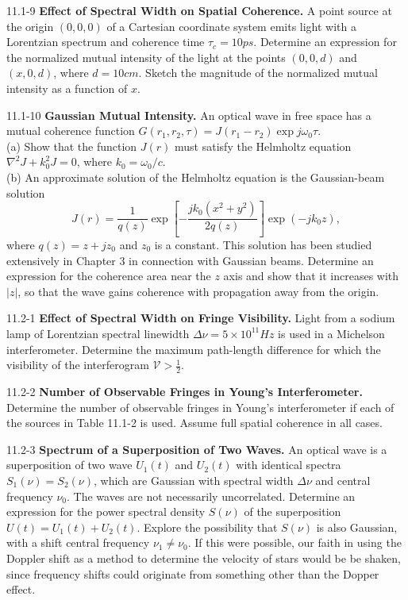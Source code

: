 \documentclass{article}
\numberwithin{figure}{subsection}
\numberwithin{table}{subsection}
\begin{document}
{\begin{hangparas}{1.4cm}{1}
\par 11.1-9 \quad\textbf{Effect of Spectral Width on Spatial Coherence.} A point source at the origin $(0, 0, 0)$ of a Cartesian coordinate system emits light with a Lorentzian spectrum and coherence time $\tau_c = 10 ps$. Determine an expression for the normalized mutual intensity of the light at the points $(0, 0, d)$ and $(x, 0, d)$, where $d = 10 cm$. Sketch the magnitude of the normalized mutual intensity as a function of $x$.
\par 11.1-10 \quad\textbf{Gaussian Mutual Intensity.} An optical wave in  free space has a mutual coherence function $G(r_1, r_2, \tau) = J(r_1 - r_2)\exp j\omega_0 \tau$.\\
(a) Show that the function $J(r)$ must satisfy the Helmholtz equation $\nabla^2 J + k_0^2 J = 0$, where $k_0 = \omega_0 / c$.\\
(b) An approximate solution of the Helmholtz equation is the Gaussian-beam solution
\begin{equation*}
J(r) = \frac{1}{q(z)}\exp [- \frac{jk_0 (x^2 + y^2)}{2q(z)}]\exp(- jk_0 z),
\end{equation*}
where $q(z) = z + jz_0$ and $z_0$ is a constant. This solution has been studied extensively in Chapter 3 in connection with Gaussian beams. Determine an expression for the coherence area near the $z$ axis and show that it increases with $\lvert z \rvert$, so that the wave gains coherence with propagation away from the origin.
\par 11.2-1 \quad\textbf{Effect of Spectral Width on Fringe Visibility.} Light from a sodium lamp of Lorentzian spectral linewidth $\Delta \nu = 5 \times 10^{11} Hz$ is used in a Michelson interferometer. Determine the maximum path-length difference for which the visibility of the interferogram $\mathcal{V} > \frac{1}{2}$.
\par 11.2-2 \quad\textbf{Number of Observable Fringes in Young's Interferometer.} Determine the number of observable fringes in Young's interferometer if each of the sources in Table 11.1-2 is used. Assume full spatial coherence in all cases.
\par 11.2-3 \quad\textbf{Spectrum of a Superposition of Two Waves.} An optical wave is a superposition of two wave $U_1(t)$ and $U_2(t)$ with identical spectra $S_1(\nu) = S_2(\nu)$, which are Gaussian with spectral width $\Delta\nu$ and central frequency $\nu_0$. The waves are not necessarily uncorrelated. Determine an expression for the power spectral density $S(\nu)$ of the superposition $U(t) = U_1(t) + U_2(t)$. Explore the possibility that $S(\nu)$ is also Gaussian, with a shift central frequency $\nu_1 \neq \nu_0$. If this were possible, our faith in using the Doppler shift as a method to determine the velocity of stars would be be shaken, since frequency shifts could originate from something other than the Dopper effect.

\end{hangparas}}
\end{document}
